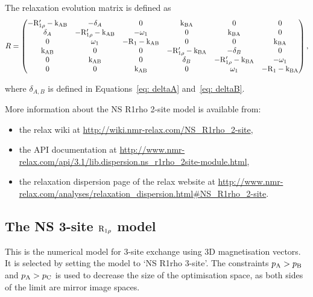 The relaxation evolution matrix is defined as
\begin{equation}
    R = \begin{pmatrix}
          -\mathrm{R}_{1\rho}'-\textrm{k}_\textrm{AB} & -\delta_A           & 0           & \textrm{k}_\textrm{BA}                & 0                   & 0 \\
          \delta_A            & -\mathrm{R}_{1\rho}'-\textrm{k}_\textrm{AB} & -\omega_1  & 0                   & \textrm{k}_\textrm{BA}                & 0 \\
          0                   & \omega_1           & -\mathrm{R}_1-\textrm{k}_\textrm{AB} & 0                   & 0                   & \textrm{k}_\textrm{BA} \\
          \textrm{k}_\textrm{AB}                & 0                   & 0           & -\mathrm{R}_{1\rho}'-\textrm{k}_\textrm{BA} & -\delta_B           & 0 \\
          0                   & \textrm{k}_\textrm{AB}                & 0           & \delta_B            & -\mathrm{R}_{1\rho}'-\textrm{k}_\textrm{BA} & -\omega_1 \\
          0                   & 0                   & \textrm{k}_\textrm{AB}        & 0                   & \omega_1           & -\mathrm{R}_1-\textrm{k}_\textrm{BA} \\
        \end{pmatrix},
\end{equation}

where $\delta_{A,B}$ is defined in Equations~\ref{eq: deltaA} and~\ref{eq: deltaB}.

More information about the NS R1rho 2-site model is available from:
\begin{itemize}
  \item the relax wiki at \url{http://wiki.nmr-relax.com/NS\_R1rho\_2-site},
  \item the API documentation at \url{http://www.nmr-relax.com/api/3.1/lib.dispersion.ns\_r1rho\_2site-module.html},
  \item the relaxation dispersion page of the relax website at \url{http://www.nmr-relax.com/analyses/relaxation\_dispersion.html#NS\_R1rho\_2-site}.
\end{itemize}



\subsection{The NS 3-site $\mathrm{R}_{1\rho}$ model}
\label{sect: dispersion: NS R1rho 3-site model}

This is the numerical model for 3-site exchange using 3D magnetisation vectors.
It is selected by setting the model to `NS R1rho 3-site'.
The constraints $p_\textrm{A} > p_\textrm{B}$ and $p_\textrm{A} > p_\textrm{C}$ is used to decrease the size of the optimisation space, as both sides of the limit are mirror image spaces.

